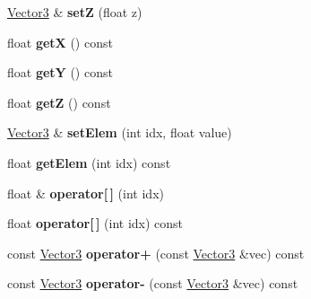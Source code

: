 \begin{DoxyCompactItemize}
\hyperlink{classVectormath_1_1Aos_1_1Vector3}{Vector3} \& {\bfseries setZ} (float z)
\item 
\mbox{\label{classVectormath_1_1Aos_1_1Vector3_ad5922a7d05e62fc193bbb9a2a6e76e2e}} 
float {\bfseries getX} () const
\item 
\mbox{\label{classVectormath_1_1Aos_1_1Vector3_a0846c1dca2c6b960d66851df852b2d15}} 
float {\bfseries getY} () const
\item 
\mbox{\label{classVectormath_1_1Aos_1_1Vector3_a4fec452a8530599d031cee2388e0db57}} 
float {\bfseries getZ} () const
\item 
\mbox{\label{classVectormath_1_1Aos_1_1Vector3_a158fd1580a9608c84496bada1a5390b9}} 
\hyperlink{classVectormath_1_1Aos_1_1Vector3}{Vector3} \& {\bfseries set\+Elem} (int idx, float value)
\item 
\mbox{\label{classVectormath_1_1Aos_1_1Vector3_a7223abb14a3f32c8af97698612bd6a6a}} 
float {\bfseries get\+Elem} (int idx) const
\item 
\mbox{\label{classVectormath_1_1Aos_1_1Vector3_ae45aafb755c6fcc6b21599723442f95e}} 
float \& {\bfseries operator\mbox{[}$\,$\mbox{]}} (int idx)
\item 
\mbox{\label{classVectormath_1_1Aos_1_1Vector3_a1d1661b1d044a2f004c7b18f27756817}} 
float {\bfseries operator\mbox{[}$\,$\mbox{]}} (int idx) const
\item 
\mbox{\label{classVectormath_1_1Aos_1_1Vector3_aa08a24dcec9063d8372c36428fc02338}} 
const \hyperlink{classVectormath_1_1Aos_1_1Vector3}{Vector3} {\bfseries operator+} (const \hyperlink{classVectormath_1_1Aos_1_1Vector3}{Vector3} \&vec) const
\item 
\mbox{\label{classVectormath_1_1Aos_1_1Vector3_acb0dde4f6b53418f40b0513656dd4424}} 
const \hyperlink{classVectormath_1_1Aos_1_1Vector3}{Vector3} {\bfseries operator-\/} (const \hyperlink{classVectormath_1_1Aos_1_1Vector3}{Vector3} \&vec) const

\end{DoxyCompactItemize}
